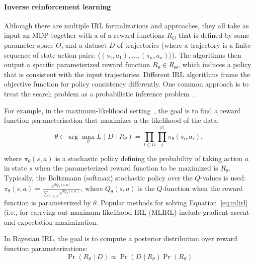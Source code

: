 
\vspace{\up}
\paragraph{Inverse reinforcement learning}

Although there are multiple IRL formalizations and approaches, they
all take as input an MDP together with a  of a reward
functions $R_\Theta$ that is defined by some parameter space $\Theta$,
and a dataset $D$ of trajectories (where a trajectory is a finite
sequence of state-action pairs: $\langle (s_1, a_1), ..., (s_n, a_n)
\rangle$). The algorithms then output a specific parameterized reward
function $R_\theta \in R_\Theta$, which induces a policy that is
consistent with the input trajectories.
%
Different IRL algorithms frame the objective function for policy
consistency differently. One common approach is to treat the
search problem as a probabilistic inference
problem~\cite{babes11,lopes2009active,ramachandran2007bayesian,ziebart2008maximum}. 


For example, in the maximum-likelihood setting~\cite{babes11}, the
goal is to find a reward function parameterization that maximizes a
the likelihood of the data:
%
\begin{equation}
\label{eq:mlirl}
\theta \in \arg\max_{\theta} L(D \mid R_{\theta}) = \prod_{t \in D} \prod_i^{|t|} \pi_{\theta}(s_i, a_i),
\end{equation}

\noindent
where $\pi_{\theta}(s, a)$ is a stochastic policy defining the
probability of taking action $a$ in state $s$ when the parameterized
reward function to be maximized is $R_{\theta}$. Typically, the
Boltzmann (softmax) stochastic policy over the $Q$-values is used:
$\pi_{\theta}(s, a) = \frac{e^{\beta Q_{\theta}(s,a)}}{\sum_{a' \in A}
  e^{\beta Q_{\theta}(s,a')}}$, where $Q_\theta(s, a)$ is the $Q$-function
when the reward function is parameterized by $\theta$.
%
Popular methods for solving Equation~\ref{eq:mlirl} (i.e., for
carrying out maximum-likelihood IRL (MLIRL) include gradient ascent
and expectation-maximization.


In Bayesian IRL, the goal is to compute a posterior distribution over
reward function parameterizations:
%
\begin{equation}
\label{eq:birl}
\Pr(R_{\theta} \mid D) \propto \Pr(D \mid R_{\theta}) \Pr(R_\theta)
\end{equation}

